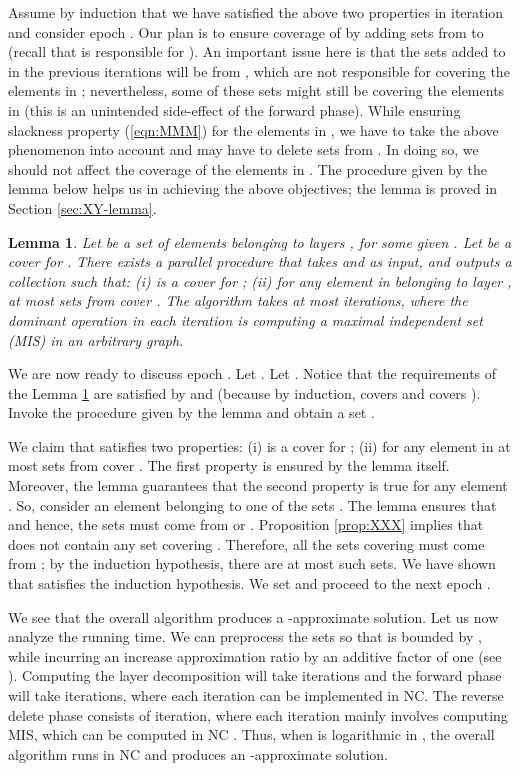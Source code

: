 \documentclass[11pt]{article}
\newtheorem{lemma}[theorem]{\bf Lemma}
\begin{document}
Assume by induction that we have satisfied the above two properties in iteration 
and consider epoch . Our plan is to ensure coverage of  by adding sets from  to 
(recall that  is responsible for ).
An important issue here is that the sets added to  in the previous iterations 
 will be from , 
which are not responsible for covering the elements in ; nevertheless, some of these sets might still be 
covering the elements in  (this is an unintended side-effect of the forward phase).
While ensuring slackness property (\ref{eqn:MMM}) for the elements in ,
we have to take the above phenomenon into account and may have to delete sets from .
In doing so, we should not affect the coverage of the elements in .
The procedure given by the lemma below helps us in achieving the above objectives;
the lemma is proved in Section \ref{sec:XY-lemma}.

\begin{lemma}
\label{lem:HHH}
Let  be a set of elements belonging to layers , for some given .
Let  be a cover for .
There exists a parallel procedure that takes  and  as input, and outputs a collection 
such that: (i)  is a cover for ; (ii) for any element in  belonging to layer ,
at most  sets from  cover . 
The algorithm takes at most  iterations, where the dominant operation
in each iteration is computing a maximal independent set (MIS) in an arbitrary graph.
\end{lemma}

We are now ready to discuss epoch . Let . 
Let .
Notice that the requirements of the Lemma \ref{lem:HHH} are satisfied by  and 
(because by induction,  covers  and 
 covers ).
Invoke the procedure given by the lemma and obtain a set . 

We claim that  satisfies two properties: 
(i)  is a cover for ;
(ii) for any element  in  at most  sets from  cover .
The first property is ensured by the lemma itself.
Moreover, the lemma guarantees that the second property is true for any element . 
So, consider an element  belonging to one of the sets .
The lemma ensures that 
and hence, the sets  must come from  or .
Proposition \ref{prop:XXX} implies that  does not contain any set covering .
Therefore, all the sets covering  must come from ; by the induction hypothesis,
there are at most  such sets.
We have shown that  satisfies the induction hypothesis.
We set  and proceed to the next epoch .

We see that the overall algorithm produces a -approximate solution.
Let us now analyze the running time.
We can preprocess the sets so that  is bounded by , while incurring an increase approximation ratio by an additive factor of one (see \cite{RV}).
Computing the layer decomposition will take  iterations and 
the forward phase will take  iterations, where each iteration can be implemented in NC.
The reverse delete phase consists of  iteration, where each iteration mainly involves
computing MIS, which can be computed in NC \cite{Luby}.
Thus, when  is logarithmic in , the overall algorithm runs in NC and produces an -approximate solution.
\end{document}
